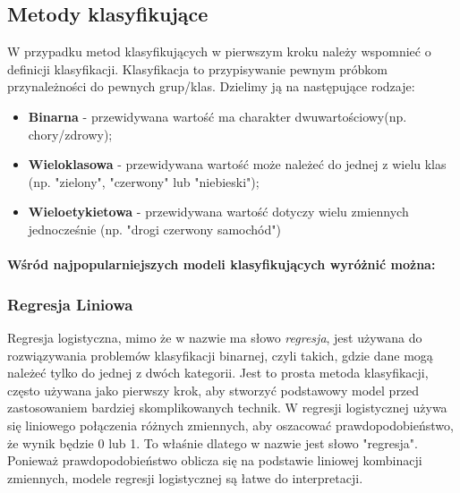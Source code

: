 \documentclass[12pt,a4paper]{article}
\begin{document}


\subsection{Metody klasyfikujące}
W przypadku metod klasyfikujących \cite{Podrecznik-AI} w pierwszym kroku należy wspomnieć o definicji klasyfikacji. Klasyfikacja to przypisywanie pewnym próbkom przynależności do pewnych grup/klas. Dzielimy ją na następujące rodzaje:

\begin{itemize}
    \item \textbf{Binarna} - przewidywana wartość ma charakter dwuwartościowy(np. chory/zdrowy);
    \item \textbf{Wieloklasowa} - przewidywana wartość może należeć do jednej z wielu klas (np. "zielony", "czerwony" lub "niebieski");
    \item \textbf{Wieloetykietowa} - przewidywana wartość dotyczy wielu zmiennych jednocześnie (np. "drogi czerwony samochód") 
\end{itemize}

\paragraph{Wśród najpopularniejszych modeli klasyfikujących wyróżnić można:}

\subsubsection{Regresja Liniowa} 
Regresja logistyczna, mimo że w nazwie ma słowo \textit{regresja}, jest używana do rozwiązywania problemów klasyfikacji binarnej, czyli takich, gdzie dane mogą należeć tylko do jednej z dwóch kategorii. Jest to prosta metoda klasyfikacji, często używana jako pierwszy krok, aby stworzyć podstawowy model przed zastosowaniem bardziej skomplikowanych technik. W regresji logistycznej używa się liniowego połączenia różnych zmiennych, aby oszacować prawdopodobieństwo, że wynik będzie 0 lub 1. To właśnie dlatego w nazwie jest słowo "regresja". Ponieważ prawdopodobieństwo oblicza się na podstawie liniowej kombinacji zmiennych, modele regresji logistycznej są łatwe do interpretacji.
\end{document}
